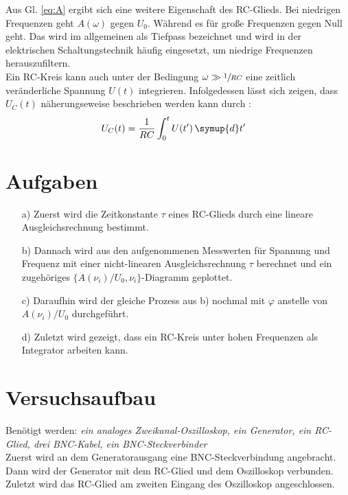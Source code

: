   Aus Gl. \eqref{eq:A} ergibt sich eine weitere Eigenschaft des RC-Glieds. Bei niedrigen 
  Frequenzen geht $A(\omega)$ gegen $U_0$. Während es für große Frequenzen
  gegen Null geht.
  Das wird im allgemeinen als Tiefpass bezeichnet und  wird in der 
  elektrischen Schaltungstechnik häufig eingesetzt, um niedrige Frequenzen
  herauszufiltern.\\
  Ein RC-Kreis kann auch unter der Bedingung $\omega \gg \sfrac{1}{RC}$ eine 
  zeitlich veränderliche Spannung $U(t)$ integrieren. Infolgedessen lässt sich 
  zeigen, dass $U_C(t)$ näherungseweise beschrieben werden kann durch \cite{V353}:
  \begin{align}
    U_C(t) &= \frac{1}{RC} \int_0^t{U(t') \, \symup{d}t'}
  \end{align}


\section{Aufgaben}
 \begin{enumerate}
    \item[a)] Zuerst wird die Zeitkonstante $\tau$ eines RC-Glieds durch 
              eine lineare Ausgleichsrechnung bestimmt.

    \item[b)] Dannach wird aus den aufgenommenen Messwerten für Spannung und 
              Frequenz mit einer nicht-linearen Ausgleichsrechnung $\tau$ berechnet 
              und ein zugehöriges $\{ A(\nu _i)/U_0,\nu _i \}$-Diagramm geplottet.
  
    \item[c)] Daraufhin wird der gleiche Prozess aus b) nochmal mit
              $\varphi$ anstelle von $A(\nu _i)/U_0$ durchgeführt.
  
    \item[d)] Zuletzt wird gezeigt, dass ein RC-Kreis unter hohen Frequenzen 
              als Integrator arbeiten kann.
  \end{enumerate}

  



\section{Versuchsaufbau}
Benötigt werden: \textit{ein analoges Zweikanal-Oszilloskop, ein Generator, ein RC-Glied, drei BNC-Kabel, ein BNC-Steckverbinder }\\
Zuerst wird an dem Generatorausgang eine BNC-Steckverbindung angebracht. 
Dann wird der Generator mit dem RC-Glied und dem Oszilloskop verbunden. \\
Zuletzt wird das RC-Glied am zweiten Eingang des Oszilloskop angeschlossen.

